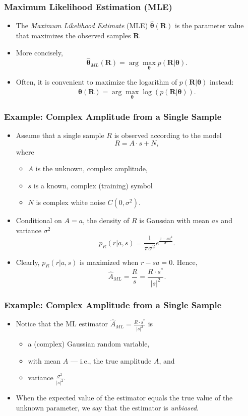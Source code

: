 \begin{frame}
  \frametitle{Maximum Likelihood Estimation (MLE)}
  \begin{itemize}
  \item The \emph{Maximum Likelihood Estimate} (MLE)
    $\bm {\hat{\theta}}({\bm  R})$ is the parameter value that
    maximizes the observed samples $\bm R$
  \item More concisely,
    \[
      \bm{\hat{\theta}}_{ML}(\bm{R}) = \arg \max_{\bm \theta} p(\bm{R} | \bm{\theta}).
    \] 
  \item Often, it is convenient to maximize the logarithm of
    $p(\bm{R} | \bm{\theta})$ instead:
    \[
      \bm{\hat{\theta}}(\bm{R}) = \arg \max_{\bm \theta} \log(p(\bm{R} | \bm{\theta})).
    \]
  \end{itemize}
\end{frame}

\begin{frame}
  \frametitle{Example: Complex Amplitude from a Single Sample}
  \begin{itemize}
  \item Assume that a single sample $R$ is observed according to the
    model
    \[
      R = A \cdot s + N,
    \]
    where
    \begin{itemize}
    \item $A$ is the unknown, complex amplitude, 
    \item $s$ is a known, complex (training) symbol
    \item $N$ is complex white noise $C(0, \sigma^2)$.
    \end{itemize}
  \item Conditional on $A=a$, the density of $R$ is Gaussian with mean
    $as$ and variance $\sigma^2$
    \[
      p_R(r | a, s) = \frac{1}{\pi \sigma^2} e^{\frac{|r-sa|^2}{\sigma^2}}.
    \]
  \item Clearly, $p_R(r | a, s)$ is maximized when $r-sa = 0$. Hence,
    \[
      \hat{A}_{ML} = \frac{R}{s} = \frac{R \cdot s^*}{|s|^2}.
    \]
  \end{itemize}
\end{frame}

\begin{frame}
  \frametitle{Example: Complex Amplitude from a Single Sample}
  \begin{itemize}
  \item Notice that the ML estimator $ \hat{A}_{ML}= \frac{R \cdot
      s^*}{|s|^2}$ is
    \begin{itemize}
    \item a (complex) Gaussian random variable,
    \item with mean $A$ --- i.e., the true amplitude $A$, and
    \item variance $\frac{\sigma^2}{|s|^2}$.
    \end{itemize}
  \item When the expected value of the estimator equals the true value
    of the unknown parameter, we say that the estimator is \emph{unbiased}.
  \end{itemize}
\end{frame}

